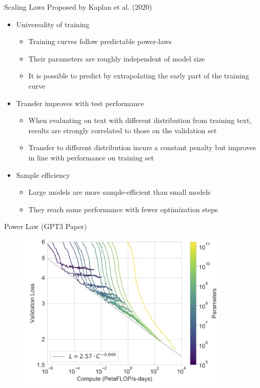 \begin{vbframe}{Scaling Laws Proposed by Kaplan et al. (2020)}

\vfill

\begin{itemize}

	\item Universality of training
	\begin{itemize}
	\item Training curves follow predictable power-laws
	\item Their parameters are roughly independent of model size
	\item It is possible to predict by extrapolating the early part of the training curve
	\end{itemize}

	\item Transfer improves with test performance
	\begin{itemize}
	\item When evaluating on text with different distribution from training text, results are strongly correlated to those on the validation set
	\item Transfer to different distribution incurs a constant penalty but improves in line with performance on training set
	\end{itemize}

	\item Sample efficiency
	\begin{itemize}
	\item Large models are more sample-efficient than small models
	\item They reach same performance with fewer optimization steps
	\end{itemize}

\end{itemize}

\vfill

\end{vbframe}


\begin{vbframe}{Power Law (GPT3 Paper)}

\begin{figure}
    \centering
    \includegraphics[width=10cm]{figure/losscompute.png}
\end{figure}
    
\end{vbframe}

